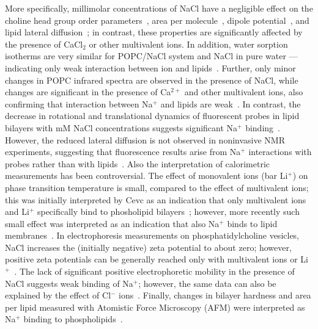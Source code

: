 \documentclass[pre,aps,floatfix,authordate1-4,twocolumn]{revtex4-1}
\begin{document}
More specifically, millimolar concentrations of NaCl have a negligible effect on the
choline head group order parameters~\cite{akutsu81}, area per molecule~\cite{pabst07}, dipole potential~\cite{clarke99},
and lipid lateral diffusion~\cite{filippov09}; in contrast, these properties are significantly affected by the presence
of CaCl$_2$ or other multivalent ions. 
In addition, water sorption isotherms are very similar for POPC/NaCl system and NaCl in pure water
---indicating only weak interaction between ion and lipids~\cite{binder02}.
Further, only minor changes in POPC infrared spectra are observed in the presence of NaCl,
while changes are significant in the presence of Ca$^{2+}$ and other multivalent ions, 
also confirming that interaction between Na$^+$ and lipids are weak~\cite{binder02}.
In contrast, the decrease in rotational and translational dynamics of fluorescent probes in lipid bilayers with mM NaCl concentrations
suggests significant Na$^{+}$ binding~\cite{bockmann03,vacha09a,harb13}. However, the reduced lateral diffusion is not observed
in noninvasive NMR experiments, suggesting that fluorescence results arise from Na$^{+}$ interactions with probes rather than with 
lipids~\cite{filippov09}. Also the interpretation of calorimetric measurements has been controversial. 
The effect of monovalent ions (bar Li$^+$)  on phase transition temperature is small, 
compared to the effect of multivalent ions; this was initially interpreted by Cevc as an indication that 
only multivalent ions and Li$^+$ specifically bind to phosholipid bilayers~\cite{cevc90}; 
however, more recently such small effect was interpreted as an indication that 
also Na$^+$ binds to lipid membranes~\cite{bockmann03,klasczyk10}.
In electrophoresis measurements on phosphatidylcholine vesicles, 
NaCl increases the (initially negative) zeta potential to about zero; 
however, positive zeta potentials can be generally reached only with multivalent ions 
or Li$^+$~\cite{eisenberg79,tatulian87,manyes05,manyes06,klasczyk10}. 
The lack of significant positive electrophoretic mobility in the presence of NaCl suggests weak binding of Na$^+$; 
however, the same data can also be explained by the effect of Cl$^-$ ions~\cite{berkowitz06,knecht13}.
Finally, changes in bilayer hardness and area per lipid measured with Atomistic Force Microscopy (AFM)
were interpreted as Na$^{+}$ binding to phospholipids~\cite{manyes05,manyes06,fukuma07,ferber11,morata12}.
\end{document}
